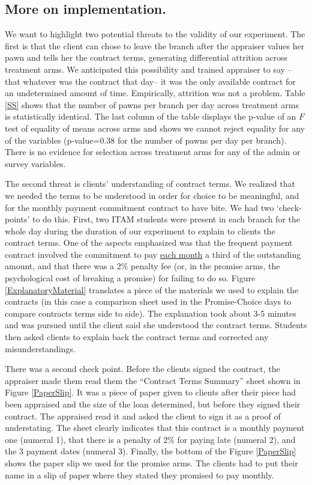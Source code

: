 \documentclass[11pt]{article}
\begin{document}
\subsection{More on implementation.} \label{implementation}

We want to highlight two potential threats to the validity of our experiment. The first is that the client can chose to leave the branch after the appraiser values her pawn and tells her the contract terms, generating differential attrition across treatment arms. We anticipated this possibility and trained appraiser to say --that whatever was the contract that day-- it was the only available contract for an undetermined amount of time. Empirically, attrition was not a problem. Table \ref{SS} shows that the number of pawns per branch per day across treatment arms is statistically identical. The last column of the table displays the p-value of an $F$ test of equality of means across arms and shows we cannot reject equality for any of the variables (p-value=0.38 for the number of pawns per day per branch). There is no evidence for selection across treatment arms for any of the admin or survey variables.

The second threat is clients' understanding of contract terms. We realized that we needed the terms to be understood in order for choice to be meaningful, and for the monthly payment commitment contract to have bite. We had two `check-points' to do this. First, two ITAM students were present in each branch for the whole day during the duration of our experiment to explain to clients the contract terms. One of the aspects emphasized was that the frequent payment contract involved the commitment to pay \underline{each month} a third of the outstanding amount, and that there was a 2\% penalty fee (or, in the promise arms, the psychological cost of breaking a promise) for failing to do so.  Figure \ref{ExplanatoryMaterial} translates a piece of the materials we used to explain the contracts (in this case a comparison sheet used in the Promise-Choice days to compare contracts terms side to side). The explanation took about 3-5 minutes and was pursued until the client said she understood the contract terms. Students then asked clients to explain back the contract terms and corrected any misunderstandings. 

There was a second check point. Before the clients signed the contract, the appraiser made them read them the ``Contract Terms Summary'' sheet shown in Figure \ref{PaperSlip}. It was a piece of paper given to clients after their piece had been appraised and the size of the loan determined, but before they signed their contract. The appraised read it and asked the client to sign it as a proof of understating. The sheet clearly indicates that this contract is a monthly payment one (numeral 1), that there is a penalty of 2\% for paying late (numeral 2), and the 3 payment dates (numeral 3). Finally, the bottom of the Figure \ref{PaperSlip} shows the paper slip we used for the promise arms. The clients had to put their name in a slip of paper where they stated they promised to pay monthly.
\end{document}

